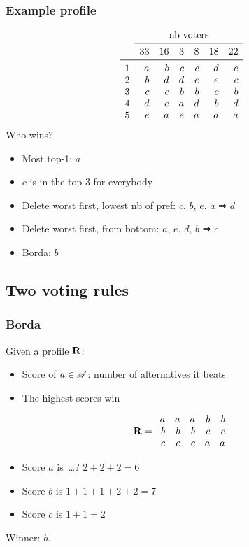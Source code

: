 \documentclass[french,english]{beamer}
\begin{document}
\begin{frame}[fragile]
	\frametitle{Example profile}
	\begin{equation}
		\begin{array}{lrrrrrr}
			&\multicolumn{6}{c}{\text{nb voters}}\\
		\cmidrule{2-7}
				&33	&16	&3	&8	&18	&22	\\
		\midrule
			1	&a	&b	&c	&c	&d	&e	\\
			2	&b	&d	&d	&e	&e	&c	\\
			3	&c	&c	&b	&b	&c	&b	\\
			4	&d	&e	&a	&d	&b	&d	\\
			5	&e	&a	&e	&a	&a	&a	\\
		\end{array}
	\end{equation}
	Who wins?\pause
	\begin{itemize}
		\item Most top-1: $a$
		\item $c$ is in the top 3 for everybody
		\item Delete worst first, lowest nb of pref: $c$, $b$, $e$, $a$ ⇒ $d$
		\item Delete worst first, from bottom: $a$, $e$, $d$, $b$ ⇒ $c$
		\item Borda: $b$
	\end{itemize}
\end{frame}

\subsection{Two voting rules}
\begin{frame}
	\frametitle{Borda}
	Given a profile $\mathbf{R}$:
	\begin{itemize}
		\item Score of $a \in \mathscr{A}$: number of alternatives it beats
		\item The highest scores win
	\end{itemize}
	
	\begin{equation}
		\mathbf{R} =
		\begin{array}{rrrrr}
			a	&	a	&	a	&	b	&	b\\
			b	&	b	&	b	&	c	&	c\\
			c	&	c	&	c	&	a	&	a
		\end{array}
	\end{equation}
	\begin{itemize}
		\item Score $a$ is~\dots? \pause $2 + 2 + 2 = 6$
		\item Score $b$ is $1 + 1 + 1 + 2 + 2 = 7$
		\item Score $c$ is $1 + 1 = 2$
	\end{itemize}
	Winner: $b$.
\end{frame}
\end{document}
